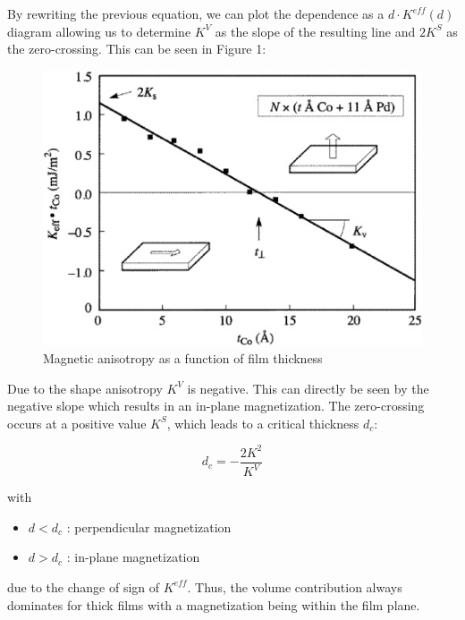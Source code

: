 \documentclass[10pt]{article} %
\begin{document}
By rewriting the previous equation, we can plot the dependence as a $d \cdot K^{eff}(d)$ diagram allowing us to determine $K^V$ as the slope of the resulting line and $2K^S$ as the zero-crossing. This can be seen in Figure 1:

\begin{figure}[H]
\begin{center}
\includegraphics[scale=0.8]{surfaceandinterface}
\caption{Magnetic anisotropy as a function of film thickness}
\end{center}
\end{figure}

Due to the shape anisotropy $K^V$ is negative. This can directly be seen by the negative slope which results in an in-plane magnetization. The zero-crossing occurs at a positive value $K^S$, which leads to a critical thickness $d_c$:

\begin{equation}
d_c = -\frac{2K^2}{K^V}
\end{equation}

with
\begin{center}
\begin{itemize}
\item $d < d_c$ : perpendicular magnetization
\item $d > d_c$ : in-plane magnetization
\end{itemize}
\end{center}

due to the change of sign of $K^{eff}$. Thus, the volume contribution always dominates for thick films with a magnetization being within the film plane. 
\end{document}
